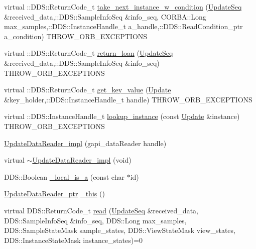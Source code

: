 \begin{DoxyCompactItemize}
\item 
virtual ::DDS::ReturnCode\_\-t \hyperlink{classKnowledge_1_1UpdateDataReader__impl_ac858c4a1a3d3180c2dfbbac3d3392f32}{take\_\-next\_\-instance\_\-w\_\-condition} (\hyperlink{namespaceKnowledge_ab62e46316b954f0d249e0e45de7059dc}{UpdateSeq} \&received\_\-data,::DDS::SampleInfoSeq \&info\_\-seq, CORBA::Long max\_\-samples,::DDS::InstanceHandle\_\-t a\_\-handle,::DDS::ReadCondition\_\-ptr a\_\-condition) THROW\_\-ORB\_\-EXCEPTIONS
\item 
virtual ::DDS::ReturnCode\_\-t \hyperlink{classKnowledge_1_1UpdateDataReader__impl_a68104ec22d7f503d293643630d199eab}{return\_\-loan} (\hyperlink{namespaceKnowledge_ab62e46316b954f0d249e0e45de7059dc}{UpdateSeq} \&received\_\-data,::DDS::SampleInfoSeq \&info\_\-seq) THROW\_\-ORB\_\-EXCEPTIONS
\item 
virtual ::DDS::ReturnCode\_\-t \hyperlink{classKnowledge_1_1UpdateDataReader__impl_a0504f611a55f93b8feffd88c9f2752e5}{get\_\-key\_\-value} (\hyperlink{structKnowledge_1_1Update}{Update} \&key\_\-holder,::DDS::InstanceHandle\_\-t handle) THROW\_\-ORB\_\-EXCEPTIONS
\item 
virtual ::DDS::InstanceHandle\_\-t \hyperlink{classKnowledge_1_1UpdateDataReader__impl_a38221e70ed56dcb773f334820fe1b0c0}{lookup\_\-instance} (const \hyperlink{structKnowledge_1_1Update}{Update} \&instance) THROW\_\-ORB\_\-EXCEPTIONS
\item 
\hyperlink{classKnowledge_1_1UpdateDataReader__impl_a1682b41abac158d755aca5561d57a41c}{UpdateDataReader\_\-impl} (gapi\_\-dataReader handle)
\item 
virtual \hyperlink{classKnowledge_1_1UpdateDataReader__impl_a9a33b0475df46ee4f1f8f12fc3c28c1d}{$\sim$UpdateDataReader\_\-impl} (void)
\item 
DDS::Boolean \hyperlink{classKnowledge_1_1UpdateDataReader_a2c0cf8dbc56adc069771319aaf4e68c5}{\_\-local\_\-is\_\-a} (const char $\ast$id)
\item 
\hyperlink{classKnowledge_1_1UpdateDataReader}{UpdateDataReader\_\-ptr} \hyperlink{classKnowledge_1_1UpdateDataReader_a2ba17dd4a2363ae8f26f9366a7eeb8f3}{\_\-this} ()
\item 
virtual DDS::ReturnCode\_\-t \hyperlink{classKnowledge_1_1UpdateDataReader_a85a1a349e1e65f5e356d5a0ad3133fe6}{read} (\hyperlink{namespaceKnowledge_ab62e46316b954f0d249e0e45de7059dc}{UpdateSeq} \&received\_\-data, DDS::SampleInfoSeq \&info\_\-seq, DDS::Long max\_\-samples, DDS::SampleStateMask sample\_\-states, DDS::ViewStateMask view\_\-states, DDS::InstanceStateMask instance\_\-states)=0

\end{DoxyCompactItemize}
